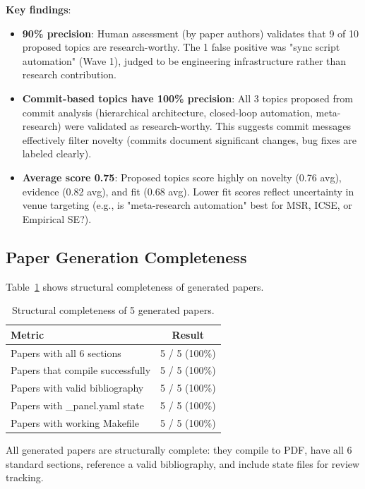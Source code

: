 \textbf{Key findings}:
\begin{itemize}
\item \textbf{90\% precision}: Human assessment (by paper authors) validates that 9 of 10 proposed topics are research-worthy. The 1 false positive was "sync script automation" (Wave 1), judged to be engineering infrastructure rather than research contribution.

\item \textbf{Commit-based topics have 100\% precision}: All 3 topics proposed from commit analysis (hierarchical architecture, closed-loop automation, meta-research) were validated as research-worthy. This suggests commit messages effectively filter novelty (commits document significant changes, bug fixes are labeled clearly).

\item \textbf{Average score 0.75}: Proposed topics score highly on novelty (0.76 avg), evidence (0.82 avg), and fit (0.68 avg). Lower fit scores reflect uncertainty in venue targeting (e.g., is "meta-research automation" best for MSR, ICSE, or Empirical SE?).
\end{itemize}

\subsection{Paper Generation Completeness}

Table~\ref{tab:generation} shows structural completeness of generated papers.

\begin{table}[t]
\centering
\caption{Structural completeness of 5 generated papers.}
\label{tab:generation}
\begin{tabular}{lc}
\toprule
Metric & Result \\
\midrule
Papers with all 6 sections & 5 / 5 (100\%) \\
Papers that compile successfully & 5 / 5 (100\%) \\
Papers with valid bibliography & 5 / 5 (100\%) \\
Papers with \_panel.yaml state & 5 / 5 (100\%) \\
Papers with working Makefile & 5 / 5 (100\%) \\
\bottomrule
\end{tabular}
\end{table}

All generated papers are structurally complete: they compile to PDF, have all 6 standard sections, reference a valid bibliography, and include state files for review tracking.

